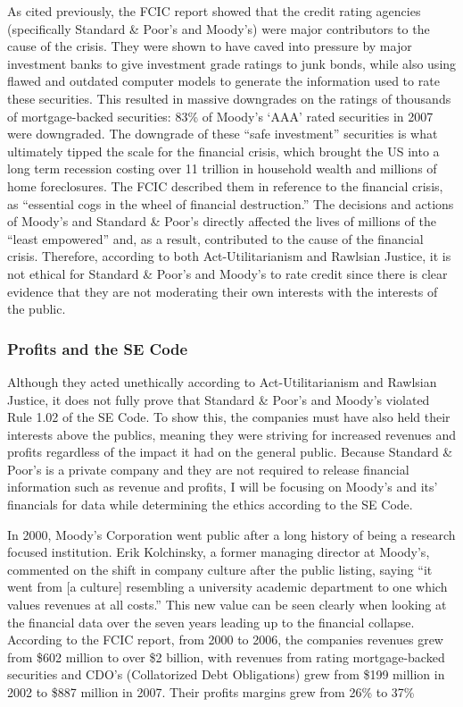 \documentclass[11pt]{article}
\begin{document}
\begin{multicols}{2}
As cited previously, the FCIC report showed that the credit rating agencies (specifically Standard \& Poor's and Moody's) were major contributors to the cause of the crisis. \cite{govtReport, huffCreditCause}  They were shown to have caved into pressure by major investment banks to give investment grade ratings to junk bonds, while also using flawed and outdated computer models to generate the information used to rate these securities. \cite[p.~xxv]{govtReport}  This resulted in massive downgrades on the ratings of thousands of mortgage-backed securities: 83\% of Moody's `AAA' rated securities in 2007 were downgraded. \cite[p.~xxv]{govtReport} The downgrade of these ``safe investment'' securities is what ultimately tipped the scale for the financial crisis, which brought the US into a long term recession costing over 11 trillion in household wealth and millions of home foreclosures. The FCIC described them in reference to the financial crisis, as ``essential cogs in the wheel of financial destruction.'' The decisions and actions of Moody's and Standard \& Poor's directly affected the lives of millions of the ``least empowered'' and, as a result, contributed to the cause of the financial crisis. Therefore, according to both Act-Utilitarianism and Rawlsian Justice, it is not ethical for Standard \& Poor's and Moody's to rate credit since there is clear evidence that they are not moderating their own interests with the interests of the public.

\subsubsection{Profits and the SE Code}

Although they acted unethically according to Act-Utilitarianism and Rawlsian Justice, it does not fully prove that Standard \& Poor's and Moody's violated Rule 1.02 of the SE Code.  To show this, the companies must have also held their interests above the publics, meaning they were striving for increased revenues and profits regardless of the impact it had on the general public.  Because Standard \& Poor's is a private company and they are not required to release financial information such as revenue and profits, I will be focusing on Moody's and its' financials for data while determining the ethics according to the SE Code.

In 2000, Moody's Corporation went public after a long history of being a research focused institution.  Erik Kolchinsky, a former managing director at Moody's, commented on the shift in company culture after the public listing, saying ``it went from [a culture] resembling a university academic department to one which values revenues at all costs.'' \cite[p.207]{govtReport}  This new value can be seen clearly when looking at the financial data over the seven years leading up to the financial collapse.  According to the FCIC report, from 2000 to 2006, the companies revenues grew from \$602 million to over \$2 billion, with revenues from rating mortgage-backed securities and CDO's (Collatorized Debt Obligations) grew from \$199 million in 2002 to \$887 million in 2007. Their profits margins grew from 26\% to 37\% \cite[p.149]{govtReport}


\end{multicols}
\end{document}
